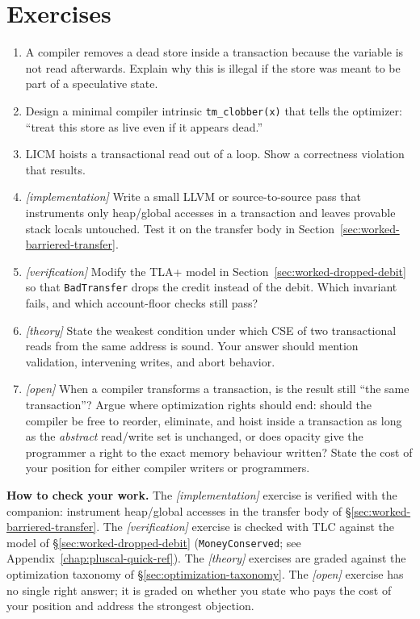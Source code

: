 \section{Exercises}
\begin{enumerate}
    \item A compiler removes a dead store inside a transaction because the variable is not read afterwards. Explain why this is illegal if the store was meant to be part of a speculative state.
    \item Design a minimal compiler intrinsic \texttt{tm\_clobber(x)} that tells the optimizer: “treat this store as live even if it appears dead.”
    \item LICM hoists a transactional read out of a loop. Show a correctness violation that results.
    \item \emph{[implementation]} Write a small LLVM or source-to-source pass that instruments only heap/global accesses in a transaction and leaves provable stack locals untouched. Test it on the transfer body in Section~\ref{sec:worked-barriered-transfer}.
    \item \emph{[verification]} Modify the TLA+ model in Section~\ref{sec:worked-dropped-debit} so that \texttt{BadTransfer} drops the credit instead of the debit. Which invariant fails, and which account-floor checks still pass?
    \item \emph{[theory]} State the weakest condition under which CSE of two transactional reads from the same address is sound. Your answer should mention validation, intervening writes, and abort behavior.
    \item \emph{[open]} When a compiler transforms a transaction, is the
          result still ``the same transaction''?  Argue where optimization
          rights should end: should the compiler be free to reorder,
          eliminate, and hoist inside a transaction as long as the
          \emph{abstract} read/write set is unchanged, or does opacity
          give the programmer a right to the exact memory behaviour
          written?  State the cost of your position for either compiler
          writers or programmers.
\end{enumerate}

\textbf{How to check your work.} The \emph{[implementation]} exercise is
verified with the companion: instrument heap/global accesses in the transfer
body of \S\ref{sec:worked-barriered-transfer}.  The \emph{[verification]}
exercise is checked with TLC against the model of
\S\ref{sec:worked-dropped-debit} (\texttt{MoneyConserved}; see
Appendix~\ref{chap:pluscal-quick-ref}).  The \emph{[theory]} exercises are
graded against the optimization taxonomy of \S\ref{sec:optimization-taxonomy}.
The \emph{[open]} exercise has no single right answer; it is graded on
whether you state who pays the cost of your position and address the
strongest objection.

